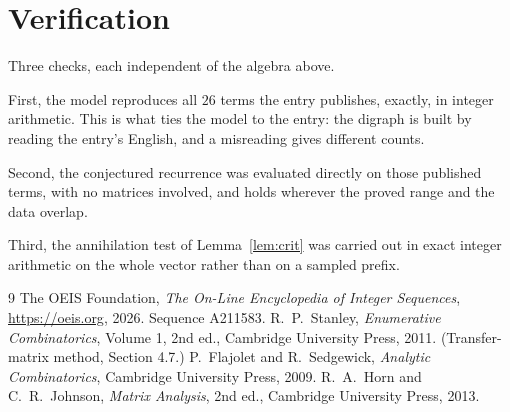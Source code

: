 \documentclass[11pt,a4paper]{article}
\theoremstyle{plain}
\theoremstyle{definition}
\begin{document}
\section{Verification}

Three checks, each independent of the algebra above.

First, the model reproduces all $26$ terms the entry publishes, exactly, in integer
arithmetic. This is what ties the model to the entry: the digraph is built by reading the
entry's English, and a misreading gives different counts.

Second, the conjectured recurrence was evaluated directly on those published terms, with no
matrices involved, and holds wherever the proved range and the data overlap.

Third, the annihilation test of Lemma~\ref{lem:crit} was carried out in exact integer
arithmetic on the whole vector rather than on a sampled prefix.

\begin{thebibliography}{9}
 The OEIS Foundation, \emph{The On-Line Encyclopedia of Integer
Sequences}, \url{https://oeis.org}, 2026. Sequence A211583.
 R.~P.~Stanley, \emph{Enumerative Combinatorics}, Volume 1, 2nd ed.,
Cambridge University Press, 2011. (Transfer-matrix method, Section 4.7.)
 P.~Flajolet and R.~Sedgewick, \emph{Analytic Combinatorics}, Cambridge
University Press, 2009.
 R.~A.~Horn and C.~R.~Johnson, \emph{Matrix Analysis}, 2nd ed., Cambridge
University Press, 2013.
\end{thebibliography}
\end{document}
